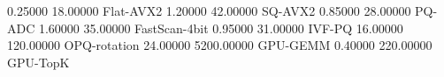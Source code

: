 0.25000 18.00000 {Flat-AVX2}
1.20000 42.00000 {SQ-AVX2}
0.85000 28.00000 {PQ-ADC}
1.60000 35.00000 {FastScan-4bit}
0.95000 31.00000 {IVF-PQ}
16.00000 120.00000 {OPQ-rotation}
24.00000 5200.00000 {GPU-GEMM}
0.40000 220.00000 {GPU-TopK}
